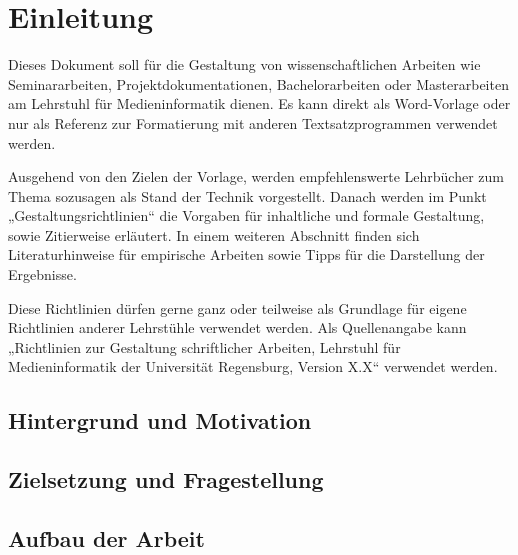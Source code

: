 \chapter{Einleitung}\label{sec:Einleitung}
\pagestyle{headings} %
Dieses Dokument soll für die Gestaltung von wissenschaftlichen Arbeiten wie Seminararbeiten, Projektdokumentationen, Bachelorarbeiten oder Masterarbeiten am Lehrstuhl für Medieninformatik dienen. Es kann direkt als Word-Vorlage oder nur als Referenz zur Formatierung mit anderen Textsatzprogrammen verwendet werden. 

Ausgehend von den Zielen der Vorlage, werden empfehlenswerte Lehrbücher zum Thema sozusagen als Stand der Technik vorgestellt. Danach werden im Punkt „Gestaltungsrichtlinien“ die Vorgaben für inhaltliche und formale Gestaltung, sowie Zitierweise erläutert. In einem weiteren Abschnitt finden sich Literaturhinweise für empirische Arbeiten sowie Tipps für die Darstellung der Ergebnisse.

Diese Richtlinien dürfen gerne ganz oder teilweise als Grundlage für eigene Richtlinien anderer Lehrstühle verwendet werden. Als Quellenangabe kann „Richtlinien zur Gestaltung schriftlicher Arbeiten, Lehrstuhl für Medieninformatik der Universität Regensburg, Version X.X“ verwendet werden.

\section{Hintergrund und Motivation}

\section{Zielsetzung und Fragestellung}

\section{Aufbau der Arbeit}
